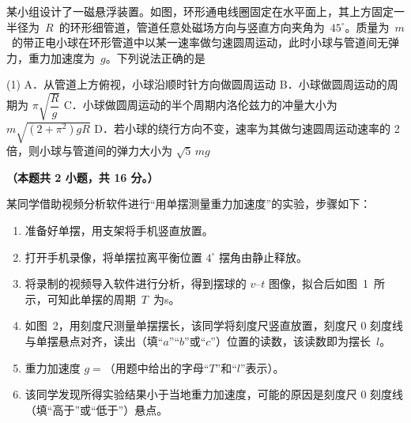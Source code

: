 \begin{question}
某小组设计了一磁悬浮装置。如图，环形通电线圈固定在水平面上，其上方固定一半径为~$R$~的环形细管道，管道任意处磁场方向与竖直方向夹角为~$45^{\circ}$。质量为~$m$~的带正电小球在环形管道中以某一速率做匀速圆周运动，此时小球与管道间无弹力，重力加速度为~$g$。下列说法正确的是\gkblank


\begin{gkopts}(1)
  \task A．从管道上方俯视，小球沿顺时针方向做圆周运动
  \task B．小球做圆周运动的周期为 $\pi\sqrt{\dfrac{R}{g}}$
  \task C．小球做圆周运动的半个周期内洛伦兹力的冲量大小为
        $m\sqrt{(2+\pi^{2})gR}$
  \task D．若小球的绕行方向不变，速率为其做匀速圆周运动速率的 2 倍，则小球与管道间的弹力大小为 $\sqrt{5}\,mg$
\end{gkopts}
\end{question}


\textbf{（本题共 2 小题，共 16 分。）}

\begin{question}
某同学借助视频分析软件进行``用单摆测量重力加速度''的实验，步骤如下：

\begin{enumerate}[leftmargin=2em]
  \item 准备好单摆，用支架将手机竖直放置。
  \item 打开手机录像，将单摆拉离平衡位置 $4^{\circ}$ 摆角由静止释放。
  \item 将录制的视频导入软件进行分析，得到摆球的 $v$--$t$ 图像，拟合后如图~1~所示，可知此单摆的周期~$T$~为\gkblank s。
  \item 如图~2，用刻度尺测量单摆摆长，该同学将刻度尺竖直放置，刻度尺 0 刻度线与单摆悬点对齐，读出\gkblank（填``$a$''``$b$''或``$c$''）位置的读数，该读数即为摆长~$l$。
  \item 重力加速度 $g=$\gkblank（用题中给出的字母``$T$''和``$l$''表示）。
  \item 该同学发现所得实验结果小于当地重力加速度，可能的原因是刻度尺 0 刻度线\gkblank（填``高于''或``低于''）悬点。
\end{enumerate}

\end{question}

